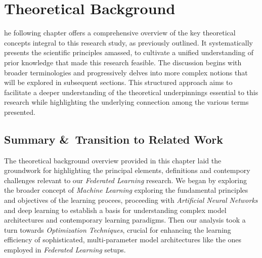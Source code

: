 \chapter{Theoretical Background}
 he following chapter offers a comprehensive overview of the key theoretical concepts integral to this research study, as previously
outlined. It systematically presents the scientific principles amassed, to cultivate a unified understanding of prior knowledge that made this research
feasible. The discussion begins with broader terminologies and progressively delves into more complex notions that will be explored in subsequent
sections. This structured approach aims to facilitate a deeper understanding of the theoretical underpinnings essential to this research while highlighting
the underlying connection among the various terms presented.













\section{Summary \&\ Transition to Related Work}
The theoretical background overview provided in this chapter laid the groundwork for highlighting the
principal elements, definitions and contempory challenges relevant to our \emph{Federated Learning} research.
We began by exploring the broader concept of \emph{Machine Learning} exploring the fundamental principles and
objectives of the learning procees, proceeding with \emph{Artificial Neural Networks} and deep learning to
establish a basis for understanding complex model architectures and contemporary learning paradigms.
Then our analysis took a turn towards \emph{Optimization Techniques}, crucial for enhancing the learning efficiency
of sophisticated, multi-parameter model architectures like the ones employed in \emph{Federated Learning} setups.


